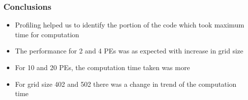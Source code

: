 \documentclass{beamer}
\begin{document}
\begin{frame}
\frametitle{Conclusions}
\begin{itemize}
\item Profiling helped us to identify the portion of the code which took maximum time for computation
\item The performance for 2 and 4 PEs was as expected with increase in grid size 
\item For 10 and 20 PEs, the computation time taken was more
\item For grid size 402 and 502 there was a change in trend of the computation time
\end{itemize}
\end{frame}
\end{document}
